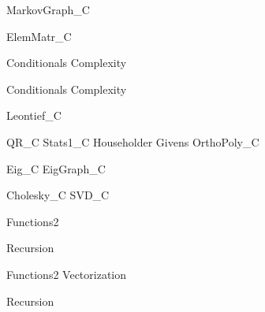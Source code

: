 \documentclass{newsiambook}
\begin{document}
{MarkovGraph_C}





{ElemMatr_C}

\begin{python}
{Conditionals}
{Complexity}
\end{python}

\begin{matlab}
{Conditionals}
{Complexity}
\end{matlab}

{Leontief_C}


{QR_C}
{Stats1_C}
{Householder}
{Givens} 
{OrthoPoly_C}

{Eig_C}
{EigGraph_C}

{Cholesky_C}
{SVD_C}


\begin{python}
{Functions2}

{Recursion}

\end{python}

\begin{matlab}
{Functions2}
{Vectorization}

{Recursion}
\end{matlab}
\end{document}
